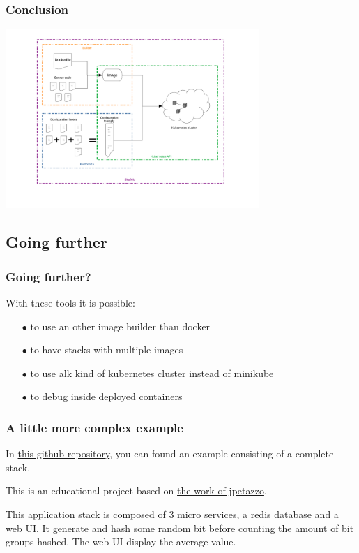 \section*{}

	\begin{frame}
		\frametitle{Conclusion}
		
		\begin{center}
		\includegraphics[height=6.8cm]{../../../resources/color/skaffoldKustomizeArchitecture.pdf}
		\end{center}
		
	\end{frame}
	
\subsection{Going further}
	\begin{frame}
		\frametitle{Going further?}
		
		With these tools it is possible:
		\begin{itemize}
			\item[$\bullet$] to use an other image builder than docker
			\item[$\bullet$] to have stacks with multiple images
			\item[$\bullet$] to use alk kind of kubernetes cluster instead of minikube
			\item[$\bullet$] to debug inside deployed containers
		\end{itemize}
	\end{frame}
	
	\begin{frame}
		\frametitle{A little more complex example}
		
		In \href{https://github.com/Tinkou/kubercoins}{this github repository}, you can found an example consisting of a complete stack.
		
		\bigskip
		
		This is an educational project based on \href{https://github.com/jpetazzo/dockercoins}{the work of jpetazzo}.
		
		\medskip
		
		This application stack is composed of 3 micro services, a redis database and a web UI. It generate and hash some random bit before counting the amount of bit groups hashed. The web UI display the average value.
		
	\end{frame}
	
